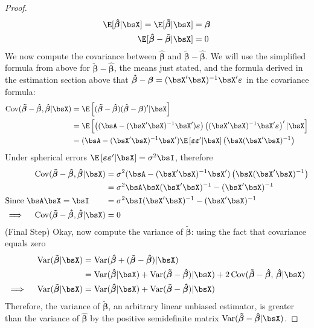 \documentclass[12pt]{article}
\theoremstyle{plain}
\theoremstyle{definition}
\theoremstyle{remark}
\newcommand{\bsvarepsilon}{\boldsymbol{\varepsilon}}
\newcommand{\bsbeta}{\boldsymbol{\beta}}
\newcommand{\bshatbeta}{\boldsymbol{\hat{\beta}}}
\newcommand{\bstildebeta}{\boldsymbol{\tilde{\beta}}}
\newcommand{\Cov}{\operatorname{Cov}}
\newcommand{\Var}{\operatorname{Var}}
\begin{document}
\begin{proof}
\begin{align*}
  \E[\bshatbeta|\bsX] = \E[\bstildebeta|\bsX] &= \bsbeta \\
  \E[\bshatbeta-\bstildebeta|\bsX] &= 0
\end{align*}
We now compute the covariance between $\bshatbeta$ and
$\bstildebeta-\bshatbeta$. We will use the simplified formula from above
for $\bstildebeta-\bshatbeta$, the means just stated, and the formula
derived in the estimation section above that
$\bshatbeta-\bsbeta=(\bsX'\bsX)^{-1}\bsX'\bsvarepsilon$ in the covariance
formula:
\begin{align*}
  \Cov(\bstildebeta - \bshatbeta,\bshatbeta|\bsX)
  &=
  \E\left[
    (\bstildebeta - \bshatbeta)
    (\bshatbeta-\bsbeta)'
    |\bsX\right]
  \\
  &=
  \E\left[
    \left((\bsA-(\bsX'\bsX)^{-1}\bsX')\bsvarepsilon\right)
    \left((\bsX'\bsX)^{-1}\bsX'\bsvarepsilon\right)'
    |\bsX\right]
  \\
  &=
  (\bsA-(\bsX'\bsX)^{-1}\bsX')
    \E\left[ \bsvarepsilon \bsvarepsilon'|\bsX\right]
    \left(\bsX(\bsX'\bsX)^{-1}\right)
\end{align*}
Under spherical errors
$\E\left[\bsvarepsilon\bsvarepsilon'|\bsX\right]=\sigma^2\bsI$,
therefore
\begin{align*}
  \Cov(\bstildebeta - \bshatbeta,\bshatbeta|\bsX)
  &=
  \sigma^2
  (\bsA-(\bsX'\bsX)^{-1}\bsX')
    \left(\bsX(\bsX'\bsX)^{-1}\right)
  \\
  &=
  \sigma^2
  \bsA \bsX(\bsX'\bsX)^{-1}
  -(\bsX'\bsX)^{-1}
  \\
  \text{Since $\bsA\bsX=\bsI$}\qquad
  &=
  \sigma^2
  \bsI(\bsX'\bsX)^{-1}
  -(\bsX'\bsX)^{-1} \\
  \implies\quad
  \Cov(\bstildebeta - \bshatbeta,\bshatbeta|\bsX)
  &= 0
\end{align*}
(Final Step)
Okay, now compute the variance of $\bstildebeta$:
using the fact that covariance equals zero
\begin{align*}
  \Var(\bstildebeta|\bsX)
  &=
  \Var(\bshatbeta + (\bstildebeta-\bshatbeta)|\bsX) \\
  &=
  \Var(\bshatbeta|\bsX) + \Var(\bstildebeta-\bshatbeta)|\bsX)
  + 2\Cov(\bstildebeta-\bshatbeta,\,\bshatbeta|\bsX)\\
  \implies\quad
  \Var(\bstildebeta|\bsX)
  &=
  \Var(\bshatbeta|\bsX) + \Var(\bstildebeta-\bshatbeta)|\bsX)
\end{align*}
Therefore, the variance of $\bstildebeta$, an arbitrary linear unbiased
estimator, is greater than the variance of $\bshatbeta$ by the positive
semidefinite matrix $\Var(\bstildebeta-\bshatbeta|\bsX)$.

\end{proof}
\end{document}
